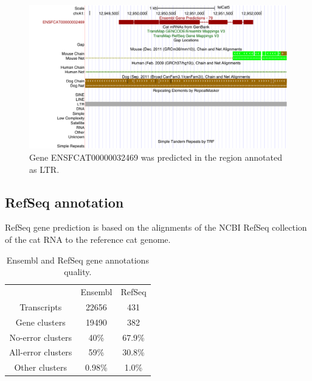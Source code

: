 \documentclass{article}
\begin{document}
\begin{figure}[h]
\centering
\includegraphics[width=\textwidth]{images/hgt_hgwdev_ede4_52c4e0.pdf}
\caption{Gene ENSFCAT00000032469 was predicted in the region annotated as LTR.}
\label{fig:gene_in_ltr}
\end{figure}


\subsection{RefSeq annotation}
RefSeq gene prediction is based on the alignments of the NCBI RefSeq collection of the cat RNA to the reference cat genome.

\begin{table}
\centering
\begin{tabular}{| c | c | c |}
\hline
&Ensembl&RefSeq\\

Transcripts& 22656 & 431\\

Gene clusters& 19490 & 382\\

No-error clusters & 40\% & 67.9\%\\

All-error clusters& 59\% & 30.8\%\\

Other clusters& 0.98\% & 1.0\%\\
\hline
\end{tabular}
\caption{Ensembl and RefSeq gene annotations quality.}
\label{table:ensembl_refseq_stats}
\end{table}
\end{document}
